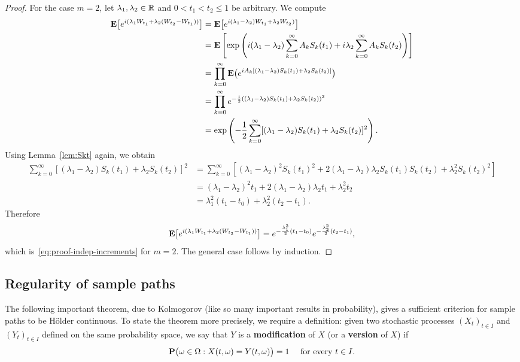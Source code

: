 \begin{proof}
    For the case $m=2$, let $\lambda_1,\lambda_2\in\mathbb{R}$ and $0<t_1<t_2\le 1$ be arbitrary. We compute
    \begin{align*}
        \mathbf{E}\big[e^{i(\lambda_1 W_{t_1} + \lambda_2(W_{t_2}-W_{t_1}))}\big] &= \mathbf{E}\big[e^{i(\lambda_1-\lambda_2)W_{t_1} + \lambda_2 W_{t_2})}\big] \\
        &= \mathbf{E}\left[\exp\left(i(\lambda_1-\lambda_2)\sum_{k=0}^\infty A_k S_k(t_1) + i\lambda_2\sum_{k=0}^\infty A_k S_k(t_2)\right)\right] \\
        &= \prod_{k=0}^\infty \mathbf{E}\big(e^{i A_k[(\lambda_1-\lambda_2)S_k(t_1)+\lambda_2 S_k(t_2)]}\big) \\
        &= \prod_{k=0}^\infty e^{-\frac{1}{2}((\lambda_1-\lambda_2)S_k(t_1)+\lambda_2 S_k(t_2))^2} \\
        &= \exp\left(-\frac{1}{2}\sum_{k=0}^\infty [(\lambda_1-\lambda_2)S_k(t_1)+\lambda_2 S_k(t_2)]^2 \right).
    \end{align*}
    Using Lemma~\ref{lem:Skt} again, we obtain
    \begin{align*}
        \sum_{k=0}^\infty [(\lambda_1-\lambda_2)S_k(t_1)+\lambda_2 S_k(t_2)]^2 &= \sum_{k=0}^\infty [(\lambda_1-\lambda_2)^2 S_k(t_1)^2 + 2(\lambda_1-\lambda_2)\lambda_2 S_k(t_1)S_k(t_2) + \lambda_2^2 S_k(t_2)^2] \\
        &= (\lambda_1-\lambda_2)^2 t_1 + 2(\lambda_1-\lambda_2)\lambda_2 t_1 + \lambda_2^2 t_2 \\
        &= \lambda_1^2 (t_1-t_0) + \lambda_2^2(t_2-t_1).
    \end{align*}
    Therefore
    \begin{equation*}
        \mathbf{E}\big[e^{i(\lambda_1 W_{t_1} + \lambda_2(W_{t_2}-W_{t_1}))}\big] = e^{-\frac{\lambda_1^2}{2}(t_1-t_0)} e^{-\frac{\lambda_2^2}{2}(t_2-t_1)},
    \end{equation*}
    which is~\eqref{eq:proof-indep-increments} for $m=2$. The general case follows by induction.
\end{proof}

\subsection{Regularity of sample paths}
\label{sec:3-reg}

The following important theorem, due to Kolmogorov (like so many important results in probability), gives a sufficient criterion for sample paths to be H\"{o}lder continuous. To state the theorem more precisely, we require a definition: given two stochastic processes $(X_t)_{t\in I}$ and $(Y_t)_{t\in I}$ defined on the same probability space, we say that $Y$ is a \textbf{modification} of $X$ (or a \textbf{version} of $X$) if
\begin{equation}
    \mathbf{P}\big(\omega\in\Omega: X(t,\omega)=Y(t,\omega)\big) = 1 \quad\text{ for every } t\in I.
\end{equation}

